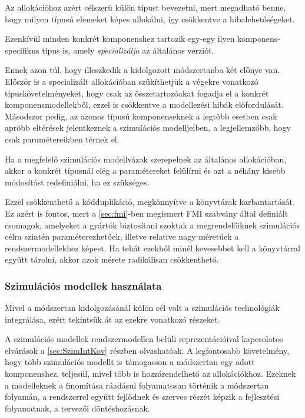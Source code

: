         Az allokációhoz azért célszerű külön típust bevezetni, mert megadható benne, hogy milyen típusú elemeket képes allokálni, így csökkentve a hibalehetőségeket.
        
        Ezenkívül minden konkrét komponenshez tartozik egy-egy ilyen komponens-specifikus típus is, amely \emph{specializálja} az általános verziót.
        
        Ennek azon túl, hogy illeszkedik a kidolgozott módszertanba két előnye van.
        Először is a specializált allokációban szűkíthetjük a végekre vonatkozó típuskövetelményeket, hogy csak az összetartozóakat fogadja el a konkrét komponensmodellekből, ezzel is csökkentve a modellezési hibák előfordulását.
        Másodszor pedig, az azonos típusú komponenseknek a legtöbb esetben csak apróbb eltérések jelentkeznek a szimulációs modelljeiben, a legjellemzőbb, hogy csak paramétereikben térnek el.
        
        Ha a megfelelő szimulációs modellvázak szerepelnek az általános allokációban, akkor a konkrét típusnál elég a paramétereket felülírni és azt a néhány kisebb módosítást redefiniálni, ha ez szükséges.
        
        Ezzel csökkenthető a kódduplikáció, megkönnyítve a könyvtárak karbantartását. Ez azért is fontos, mert a \ref{sec:fmi}-ben megismert FMI szabvány által definiált csomagok, amelyeket a gyártók biztosítani szoktak a megrendelőiknek szimulációs célra szintén paraméterezhetőek, illetve relative nagy méretűek a rendszermodellekhez képest.
        Ha tehát ezekből minél kevesebbet kell a könyvtárral együtt tárolni, akkor azok mérete radikálisan csökkenthető.

        \subsubsection{Szimulációs modellek használata}
        Mivel a módszertan kidolgozásánál külön cél volt a szimulációs technológiák integrálása, ezért tekintsük át az ezekre vonatkozó részeket.
        
        A szimulációs modellek rendszermodellen belüli reprezentációival kapcsolatos elvárások a \ref{sec:SzimIntKov} részben olvashatóak. A legfontosabb követelmény, hogy több szimulációs modellt is támogasson a módszertan egy adott komponenshez, teljesül, mivel több is hozzárendelhető az allokációkhoz.
        Ezeknek a modelleknek a finomítása ráadásul folyamatosan történik a módszertan folyamán, a rendszerrel együtt fejlődnek és szerves részét képzik a fejlesztési folyamatnak, a tervezői döntéshozásnak.
        
